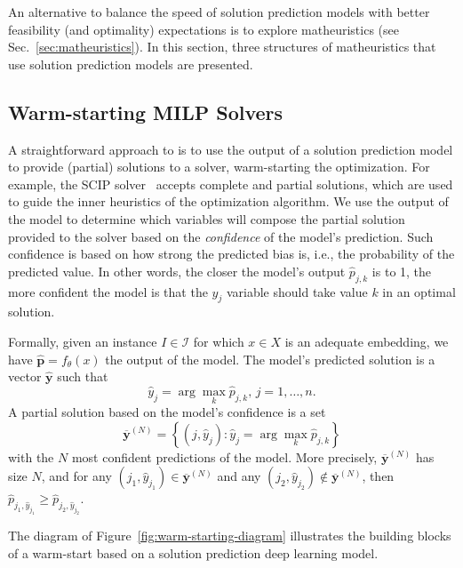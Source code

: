 An alternative to balance the speed of solution prediction models with better feasibility (and optimality) expectations is to explore matheuristics (see Sec.~\ref{sec:matheuristics}).
In this section, three structures of matheuristics that use solution prediction models are presented.

\subsection{Warm-starting MILP Solvers}

A straightforward approach to is to use the output of a solution prediction model to provide (partial) solutions to a solver, warm-starting the optimization.
For example, the SCIP solver~\cite{bestuzhevaSCIPOptimizationSuite2021} accepts complete and partial solutions, which are used to guide the inner heuristics of the optimization algorithm.
We use the output of the model to determine which variables will compose the partial solution provided to the solver based on the \emph{confidence} of the model's prediction.
Such confidence is based on how strong the predicted bias is, i.e., the probability of the predicted value.
In other words, the closer the model's output $\hat{p}_{j,k}$ is to 1, the more confident the model is that the $y_j$ variable should take value $k$ in an optimal solution.

Formally, given an instance $I\in \mathcal{I}$ for which $x\in X$ is an adequate embedding, we have $\hat{\bm{p}} = f_\theta(x)$ the output of the model.
The model's predicted solution is a vector $\hat{\bm{y}}$ such that \[
    \hat{y}_j = \arg\max_{k} \hat{p}_{j,k},\, j=1,\ldots,n
.\] 
A partial solution based on the model's confidence is a set
\begin{equation}\label{eq:partial-solution}
    \overline{\bm{y}}^{(N)} = \left\{ (j,\hat{y}_j) : \hat{y}_j = \arg\max_{k} \hat{p}_{j,k} \right\}
\end{equation}
with the $N$ most confident predictions of the model.
More precisely, $\overline{\bm{y}}^{(N)}$ has size $N$, and for any $(j_1,\hat{y}_{j_1})\in \overline{\bm{y}}^{(N)}$ and any $(j_2,\hat{y}_{j_2}) \notin \overline{\bm{y}}^{(N)}$, then $\hat{p}_{j_1,\hat{y}_{j_1}} \ge \hat{p}_{j_2,\hat{y}_{j_2}}$.

The diagram of Figure~\ref{fig:warm-starting-diagram} illustrates the building blocks of a warm-start based on a solution prediction deep learning model.

